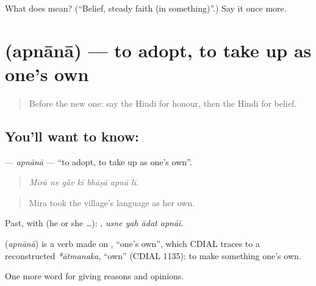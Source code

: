 \begin{tcolorbox}[breakable,colback=teal!4,colframe=teal!35!black,title={Before you move on}]
What does  mean? (\textquotedblleft{}Belief, steady faith (in something)\textquotedblright{}.) Say it once more.
\end{tcolorbox}
\section[\texorpdfstring{\hi{अपनाना} (apnānā)}{अपनाना (apnānā)}]{ (apnānā) — to adopt, to take up as one's own}

\label{lesson:HI-C357-apnana}



\begin{quote}
Before the new one: say the Hindi for honour, then the Hindi for belief.
\end{quote}

\subsection*{You'll want to know: }
\textbf{} — \emph{apnānā} — \textquotedblleft{}to adopt, to take up as one's own\textquotedblright{}.

\begin{quote}
      
\end{quote}

\begin{quote}
\emph{Mīrā ne gā̃v kī bhāṣā apnā lī.}
\end{quote}

\begin{quote}
Mira took the village's language as her own.
\end{quote}

Past, with  (he or she …):    , \emph{usne yah ādat apnāī}.

\begin{cousinweb}
\textbf{} (\emph{apnānā}) is a verb made on , \textquotedblleft{}one's own\textquotedblright{}, which CDIAL traces to a reconstructed \emph{*ātmanaka}, \textquotedblleft{}own\textquotedblright{} (CDIAL 1135): to make something one's own.
\end{cousinweb}

\begin{grammarlens}[title={What you've built}]
One more word for giving reasons and opinions.
\end{grammarlens}

